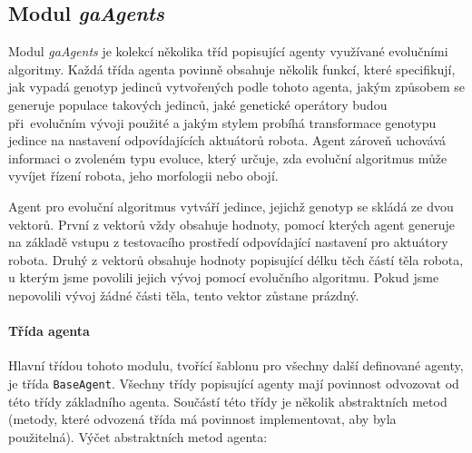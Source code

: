 \subsection{Modul \emph{gaAgents}} \label{imp:gaAgents}
Modul \emph{gaAgents} je kolekcí několika tříd popisující agenty využívané
evolučními algoritmy. Každá třída agenta povinně obsahuje několik funkcí, které
specifikují, jak vypadá genotyp jedinců vytvořených podle tohoto agenta, jakým
způsobem se generuje populace takových jedinců, jaké genetické operátory budou
při~evolučním vývoji použité a jakým stylem probíhá transformace genotypu
jedince na nastavení odpovídajících aktuátorů robota. Agent zároveň uchovává
informaci o zvoleném typu evoluce, který určuje, zda evoluční algoritmus může
vyvíjet řízení robota, jeho morfologii nebo obojí.

Agent pro evoluční algoritmus vytváří jedince, jejichž genotyp se skládá ze
dvou vektorů. První z vektorů vždy obsahuje hodnoty, pomocí kterých agent
generuje na základě vstupu z testovacího prostředí odpovídající nastavení pro
aktuátory robota. Druhý z vektorů obsahuje hodnoty popisující délku těch částí
těla robota, u kterým jsme povolili jejich vývoj pomocí evolučního algoritmu.
Pokud jsme nepovolili vývoj žádné části těla, tento vektor zůstane prázdný.

\paragraph{Třída agenta}
Hlavní třídou tohoto modulu, tvořící šablonu pro všechny další definované
agenty, je třída \texttt{BaseAgent}. Všechny třídy popisující agenty mají
povinnost odvozovat od této třídy základního agenta. Součástí této třídy je
několik abstraktních metod (metody, které odvozená třída má povinnost
implementovat, aby byla použitelná). Výčet abstraktních metod agenta:

